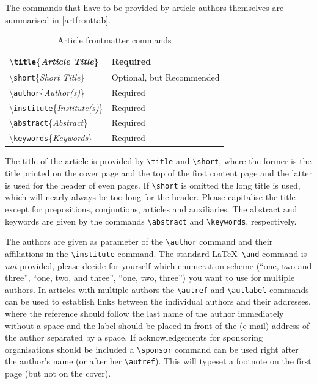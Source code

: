 \documentclass{eceasst}
\begin{document}
\medskip

The commands that have to be provided by article authors themselves are
summarised in \autoref{artfronttab}.
\begin{table}
\centering
\caption{Article frontmatter commands}\label{artfronttab}
\begin{tabular}{|l|l|}
\hline
\textbackslash\texttt{title}\{\textit{Article Title}\} &
Required \\\hline
\textbackslash\texttt{short}\{\textit{Short Title}\} &
Optional, but Recommended \\\hline
\textbackslash\texttt{author}\{\textit{Author(s)}\} &
Required \\\hline
\textbackslash\texttt{institute}\{\textit{Institute(s)}\} &
Required \\\hline
\textbackslash\texttt{abstract}\{\textit{Abstract}\} &
Required \\\hline
\textbackslash\texttt{keywords}\{\textit{Keywords}\} &
Required \\\hline
\end{tabular}
\end{table}
The title of the article is provided by \verb|\title| and \verb|\short|, where
the former is the title printed on the cover page and the top of the first
content page and the latter is used for the header of even pages.
If \verb|\short| is omitted the long title is used, which will nearly always
be too long for the header.
Please capitalise the title except for prepositions, conjuntions, articles
and auxiliaries.
The abstract and keywords are given by the commands \verb|\abstract| and
\verb|\keywords|, respectively.

The authors are given as parameter of the \verb|\author| command and their
affiliations in the \verb|\institute| command.
The standard \LaTeX\ \verb|\and| command is \emph{not} provided, please decide
for yourself which enumeration scheme (``one, two and three'', ``one, two, and
three'', ``one, two, three'') you want to use for multiple authors.
In articles with multiple authors the \verb|\autref| and \verb|\autlabel|
commands can be used to establish links between the individual authors and
their addresses, where the reference should follow the last name of the author
immediately without a space and the label should be placed in front of the
(e-mail) address of the author separated by a space.
If acknowledgements for sponsoring organisations should be included a
\verb|\sponsor| command can be used right after the author's name (or after
her \verb|\autref|).
This will typeset a footnote on the first page (but not on the cover).
\end{document}
